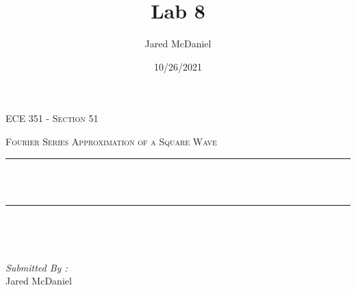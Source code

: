 \documentclass[12pt]{report}
\title{Lab 8}
\author{ Jared McDaniel}
\date{10/26/2021}
\makeatletter
\let\thetitle\@title
\makeatother
\begin{document}

\begin{titlepage}
	\centering
    \vspace*{0.5 cm}
\begin{center}    \textsc{\Large   ECE 351 - Section 51 }\\[2.0 cm]	\end{center}%
	\textsc{\Large Fourier Series Approximation of a Square Wave  }\\[0.5 cm]				%
	\rule{\linewidth}{0.2 mm} \\[0.4 cm]
	{ \huge \bfseries \thetitle}\\
	\rule{\linewidth}{0.2 mm} \\[1.5 cm]
	
	\begin{minipage}{0.4\textwidth}
		\begin{flushleft} \large
			\end{flushleft}
			\end{minipage}~
			\begin{minipage}{0.4\textwidth}
            
			\begin{flushright} \large
			\emph{Submitted By :} \\
			Jared McDaniel  
		\end{flushright}
           
	\end{minipage}\\[2 cm]
	
    
    
    
    
	
\end{titlepage}


\tableofcontents
\pagebreak

\renewcommand{\thesection}{\arabic{section}}
\end{document}
